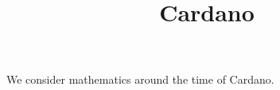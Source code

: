 \documentclass{ximera}
\title{Cardano}
\begin{document}
\begin{abstract}
\end{abstract}
\maketitle

We consider mathematics around the time of Cardano.
\end{document}
